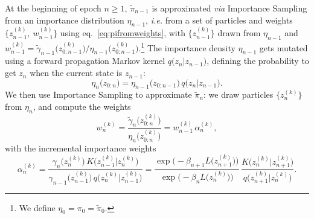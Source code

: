 \documentclass[11pt,a4paper]{article}
\begin{document}
	At the beginning of epoch $n\geq1$, $\tilde{\pi}_{n-1}$ is approximated \textit{via} Importance Sampling from an importance distribution $\eta_{n-1}$, \textit{i.e.} from a set of particles and weights $\big\{z_{n-1}^{(k)},\ w_{n-1}^{(k)}\big\}$ using eq.~\eqref{eq:pifromweights}, with $\big\{z_{n-1}^{(k)}\big\}$ drawn from $\eta_{n-1}$ and $w_{n-1}^{(k)} = \tilde{\gamma}_{n-1}\big(z_{0:n-1}^{(k)}\big)/\eta_{n-1}\big(z_{0:n-1}^{(k)}\big)$.\footnote{We define $\eta_{0} = \pi_{0} = \tilde{\pi}_{0}$.} The importance density $\eta_{n-1}$ gets mutated using a forward propagation Markov kernel $q\big(z_{n}\vert z_{n-1}\big)$, defining the probability to get $z_{n}$ when the current state is $z_{n-1}$:
	\begin{equation}
		\eta_{n}\big(z_{0:n}\big) = \eta_{n-1}\big(z_{0:n-1}\big)\,q\big(z_{n}\vert z_{n-1}\big).
	\end{equation}
	We then use Importance Sampling to approximate $\tilde{\pi}_{n}$: we draw particles $\big\{z^{(k)}_{n}\big\}$ from $\eta_{n}$, and compute the weights
	\begin{equation} \label{eq:weightsupdate}
		w_{n}^{(k)} = \frac{\tilde{\gamma}_{n}\big(z_{0:n}^{(k)}\big)}{\eta_{n}\big(z_{0:n}^{(k)}\big)} = w_{n-1}^{(k)}\,\alpha_{n}^{(k)},
	\end{equation}
	with the incremental importance weights
	\begin{equation}	\label{eq: incremental_importance}
			\alpha^{(k)}_{n} =  \frac{\gamma_{n}\big(z_{n}^{(k)}\big)\,K\big(z^{(k)}_{n-1}\vert z^{(k)}_{n}\big)}{\gamma_{n-1}\big(z_{n-1}^{(k)}\big)\,q\big(z^{(k)}_{n}\vert z^{(k)}_{n-1}\big)} = \frac{\exp\Big(-\beta_{n+1}L\big(z_{n+1}^{(k)}\big)\Big)}{\exp\Big(-\beta_{n}L\big(z_{n}^{(k)}\big)\Big)}\,\frac{K\big(z^{(k)}_{n}\vert z^{(k)}_{n+1}\big)}{q\big(z^{(k)}_{n+1}\vert z^{(k)}_{n}\big)}.
	\end{equation}
\end{document}
